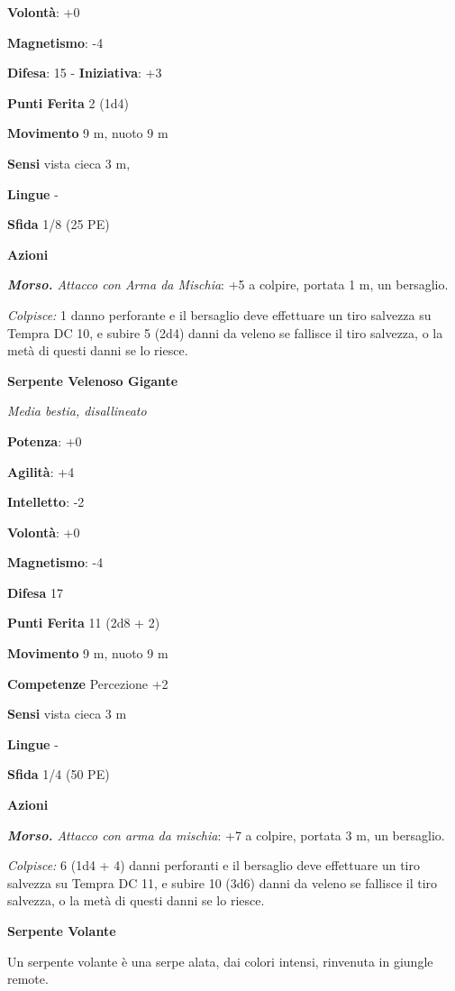 \begin{multicols}{2}
\textbf{Volontà}: +0

\textbf{Magnetismo}: -4

\textbf{Difesa}: 15 - \textbf{Iniziativa}: +3

\textbf{Punti Ferita} 2 (1d4)

\textbf{Movimento} 9 m, nuoto 9 m

\textbf{Sensi} vista cieca 3 m, 

\textbf{Lingue} -

\textbf{Sfida} 1/8 (25 PE)\smallskip

\smallskip\textbf{Azioni}

\emph{\textbf{Morso.} Attacco con Arma da Mischia}: +5 a colpire,
portata 1 m, un bersaglio.

\emph{Colpisce:} 1 danno perforante e il bersaglio deve effettuare un
tiro salvezza su Tempra DC 10, e subire 5 (2d4) danni da veleno se
fallisce il tiro salvezza, o la metà di questi danni se lo riesce.

\textbf{Serpente Velenoso Gigante}

\emph{Media bestia, disallineato}

\textbf{Potenza}: +0

\textbf{Agilità}: +4

\textbf{Intelletto}: -2

\textbf{Volontà}: +0

\textbf{Magnetismo}: -4

\textbf{Difesa} 17

\textbf{Punti Ferita} 11 (2d8 + 2)

\textbf{Movimento} 9 m, nuoto 9 m

\textbf{Competenze} Percezione +2

\textbf{Sensi} vista cieca 3 m

\textbf{Lingue} -

\textbf{Sfida} 1/4 (50 PE)\smallskip

\smallskip\textbf{Azioni}

\emph{\textbf{Morso.} Attacco con arma da mischia}: +7 a colpire,
portata 3 m, un bersaglio.

\emph{Colpisce:} 6 (1d4 + 4) danni perforanti e il bersaglio deve
effettuare un tiro salvezza su Tempra DC 11, e subire 10 (3d6)
danni da veleno se fallisce il tiro salvezza, o la metà di questi danni
se lo riesce.

\textbf{Serpente Volante}

Un serpente volante è una serpe alata, dai colori intensi, rinvenuta in
giungle remote.


\end{multicols}
